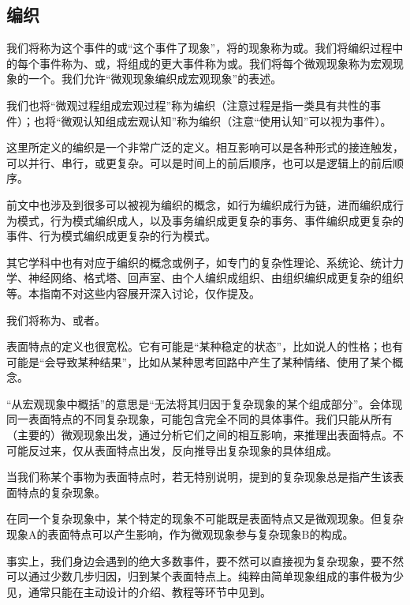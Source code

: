 \subsection{编织}
我们将称为这个事件的或“这个事件了现象”，将的现象称为或。我们将编织过程中的每个事件称为、或，将组成的更大事件称为或。我们将每个微观现象称为宏观现象的一个。我们允许“微观现象编织成宏观现象”的表述。

我们也将“微观过程组成宏观过程”\label{def:复杂过程}称为编织（注意过程是指一类具有共性的事件）；也将“微观认知组成宏观认知”称为编织（注意“使用认知”可以视为事件）。
\begin{examples}
这里所定义的编织是一个非常广泛的定义。相互影响可以是各种形式的接连触发，可以并行、串行，或更复杂。可以是时间上的前后顺序，也可以是逻辑上的前后顺序。

前文中也涉及到很多可以被视为编织的概念，如行为编织成行为链，进而编织成行为模式，行为模式编织成人，以及事务编织成更复杂的事务、事件编织成更复杂的事件、行为模式编织成更复杂的行为模式。

其它学科中也有对应于编织的概念或例子，如专门的复杂性理论、系统论、统计力学、神经网络、格式塔、回声室、由个人编织成组织、由组织编织成更复杂的组织等。本指南不对这些内容展开深入讨论，仅作提及。
\end{examples}
我们将称为、或者。
\begin{examples}
表面特点的定义也很宽松。它有可能是“某种稳定的状态”，比如说人的性格；也有可能是“会导致某种结果”，比如从某种思考回路中产生了某种情绪、使用了某个概念。

“从宏观现象中概括”的意思是“无法将其归因于复杂现象的某个组成部分”。会体现同一表面特点的不同复杂现象，可能包含完全不同的具体事件。我们只能从所有（主要的）微观现象出发，通过分析它们之间的相互影响，来推理出表面特点。不可能反过来，仅从表面特点出发，反向推导出复杂现象的具体组成。
\end{examples}
当我们称某个事物为表面特点时，若无特别说明，提到的复杂现象总是指产生该表面特点的复杂现象。
\begin{explain}
在同一个复杂现象中，某个特定的现象不可能既是表面特点又是微观现象。但复杂现象A的表面特点可以产生影响，作为微观现象参与复杂现象B的构成。

事实上，我们身边会遇到的绝大多数事件，要不然可以直接视为复杂现象，要不然可以通过少数几步归因，归到某个表面特点上。纯粹由简单现象组成的事件极为少见，通常只能在主动设计的介绍、教程等环节中见到。
\end{explain}

